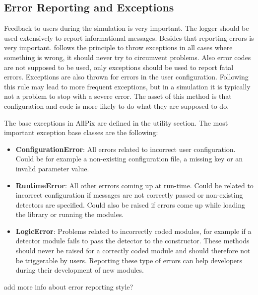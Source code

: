 \subsection{Error Reporting and Exceptions}
\label{sec:error_reporting_exceptions}
Feedback to users during the simulation is very important. The logger should be used extensively to report informational messages. Besides that reporting errors is very important. \apsq follows the principle to throw exceptions in all cases where something is wrong, it should never try to circumvent problems. Also error codes are not supposed to be used, only exceptions should be used to report fatal errors. Exceptions are also thrown for errors in the user configuration. Following this rule may lead to more frequent exceptions, but in a simulation it is typically not a problem to stop with a severe error. The asset of this method is that configuration and code is more likely to do what they are supposed to do.

The base exceptions in AllPix are defined in the utility section. The most important exception base classes are the following:
\begin{itemize}
\item \textbf{ConfigurationError}: All errors related to incorrect user configuration. Could be for example a non-existing configuration file, a missing key or an invalid parameter value.
\item \textbf{RuntimeError}: All other errrors coming up at run-time. Could be related to incorrect configuration if messages are not correctly passed or non-existing detectors are specified. Could also be raised if errors come up while loading the library or running the modules.
\item \textbf{LogicError}: Problems related to incorrectly coded modules, for example if a detector module fails to pass the detector to the constructor. These methods should never be raised for a correctly coded module and should therefore not be triggerable by users. Reporting these type of errors can help developers during their development of new modules.
\end{itemize}

\todo add more info about error reporting style? \todo
